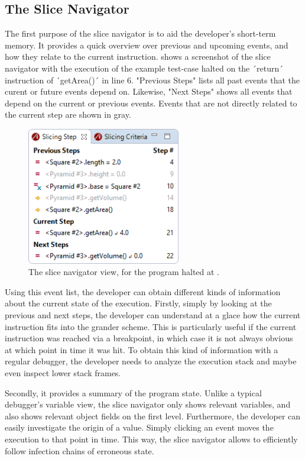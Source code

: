 ﻿\documentclass[
      english,
      ]{llncs}
\begin{document}
\subsection{The Slice Navigator}

The first purpose of the slice navigator is to aid the developer's short-term memory.
It provides a quick overview over previous and upcoming events, and how they relate to the current instruction.
 shows a screenshot of the slice navigator with the execution of the example test-case halted on the ´return´ instruction of ´getArea()´ in line 6.
"Previous Steps" lists all past events that the curent or future events depend on.
Likewise, "Next Steps" shows all events that depend on the current or previous events.
Events that are not directly related to the current step are shown in gray.

\begin{figure}
	\centering
		\includegraphics[width=0.60\textwidth]{slice1.png}
	\caption{The slice navigator view, for the program halted at .}
	\label{fig:slice1}
\end{figure}

Using this event list, the developer can obtain different kinds of information about the current state of the execution.
Firstly, simply by looking at the previous and next steps, the developer can understand at a glace how the current instruction fits into the grander scheme.
This is particularly useful if the current instruction was reached via a breakpoint, in which case it is not always obvious at which point in time it was hit.
To obtain this kind of information with a regular debugger, the developer needs to analyze the execution stack and maybe even inspect lower stack frames.

Secondly, it provides a summary of the program state.
Unlike a typical debugger's variable view, the slice navigator only shows relevant variables, and also shows relevant object fields on the first level.
Furthermore, the developer can easily investigate the origin of a value.
Simply clicking an event moves the execution to that point in time.
This way, the slice navigator allows to efficiently follow infection chains of erroneous state.
\end{document}
